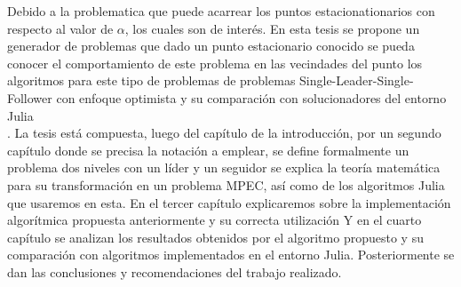 Debido a la problematica que puede acarrear los puntos estacionationarios con respecto al valor de $\alpha$, los cuales son de interés. 
En esta tesis se propone un generador de problemas que dado un punto estacionario conocido se pueda conocer el comportamiento de este problema en las vecindades del punto los algoritmos para este tipo de problemas de problemas Single-Leader-Single-Follower con enfoque optimista y su comparación con solucionadores del entorno Julia\\.
La tesis está compuesta, luego del capítulo de la introducción, por un segundo capítulo donde se precisa la notación a emplear, se define formalmente un problema dos niveles con un líder y un seguidor se explica la teoría matemática para su transformación en un problema MPEC, así como de los algoritmos Julia que usaremos en esta.
En el tercer capítulo explicaremos sobre la implementación algorítmica propuesta anteriormente y su correcta utilización 
Y en el cuarto capítulo se analizan los resultados obtenidos por el algoritmo propuesto y su comparación con algoritmos implementados en el entorno Julia.
Posteriormente se dan las conclusiones y recomendaciones del trabajo realizado.

